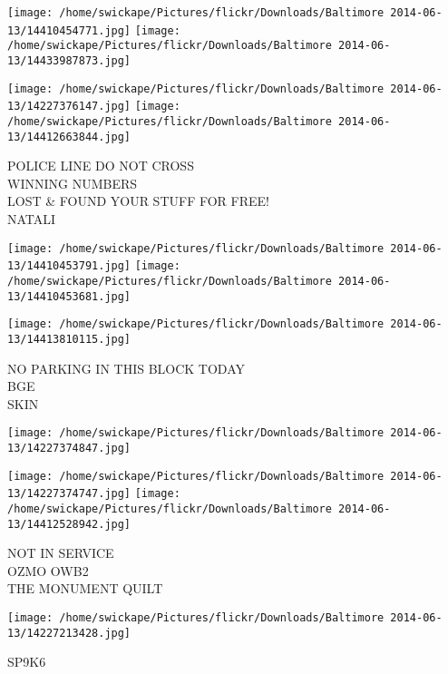 \documentclass[10pt,letterpaper]{article}
\begin{document}
\texttt{[image: /home/swickape/Pictures/flickr/Downloads/Baltimore 2014-06-13/14410454771.jpg]}
\texttt{[image: /home/swickape/Pictures/flickr/Downloads/Baltimore 2014-06-13/14433987873.jpg]}

\texttt{[image: /home/swickape/Pictures/flickr/Downloads/Baltimore 2014-06-13/14227376147.jpg]}
\texttt{[image: /home/swickape/Pictures/flickr/Downloads/Baltimore 2014-06-13/14412663844.jpg]}

POLICE LINE DO NOT CROSS\\
WINNING NUMBERS\\
LOST \& FOUND YOUR STUFF FOR FREE!\\
NATALI\\
\pagebreak

\texttt{[image: /home/swickape/Pictures/flickr/Downloads/Baltimore 2014-06-13/14410453791.jpg]}
\texttt{[image: /home/swickape/Pictures/flickr/Downloads/Baltimore 2014-06-13/14410453681.jpg]}

\texttt{[image: /home/swickape/Pictures/flickr/Downloads/Baltimore 2014-06-13/14413810115.jpg]}

NO PARKING IN THIS BLOCK TODAY\\
BGE\\
SKIN\\
\pagebreak

\texttt{[image: /home/swickape/Pictures/flickr/Downloads/Baltimore 2014-06-13/14227374847.jpg]}

\vspace{0.25in}
\texttt{[image: /home/swickape/Pictures/flickr/Downloads/Baltimore 2014-06-13/14227374747.jpg]}
\texttt{[image: /home/swickape/Pictures/flickr/Downloads/Baltimore 2014-06-13/14412528942.jpg]}

NOT IN SERVICE\\
OZMO OWB2\\
THE MONUMENT QUILT\\
\pagebreak

\texttt{[image: /home/swickape/Pictures/flickr/Downloads/Baltimore 2014-06-13/14227213428.jpg]}

SP9K6\\
\pagebreak
\end{document}
